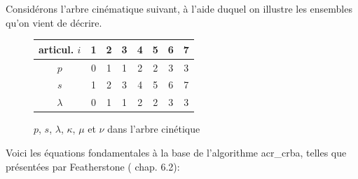 \documentclass{report}
\begin{document}
Considérons l'arbre cinématique suivant, à l'aide duquel on illustre les ensembles qu'on vient de décrire.\\

\begin{figure}[H]
{%
  \begin{center}
  	\end{center}
}
{%
  \begin{center}
  	\begin{tabular}{|c|c|c|c|c|c|c|c|}
  	\hline 
	articul. $i$ & 1 & 2 & 3 & 4 & 5 & 6 & 7 \\ 
  	\hline 
  	$p$ & 0 & 1 & 1 & 2 & 2 & 3 & 3 \\ 
  	\hline 
  	$s$ & 1 & 2 & 3 & 4 & 5 & 6 & 7 \\ 
  	\hline 
  	$\lambda$ & 0 & 1 & 1 & 2 & 2 & 3 & 3 \\ 
  	\hline 
  	\end{tabular} 
  \end{center}
}{}
\caption{$p$, $s$, $\lambda$, $\kappa$, $\mu$ et $\nu$ dans l'arbre cinétique}
\label{fig_chdaArbreK_p_s_k_mu_nu}
\end{figure}

Voici les équations fondamentales à la base de l'algorithme \gls{acr_crba}, telles que présentées par Featherstone (\cite{bib_featherstone} chap. 6.2):

{%
}
{%
}{}
\end{document}

